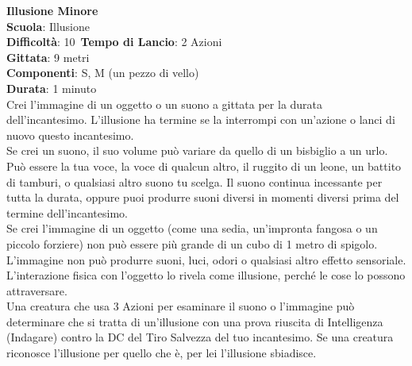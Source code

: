 \begin{multicols}{2}
\medskip\textbf{Illusione Minore}\\
\textbf{Scuola}: Illusione\\
\textbf{Difficoltà}: 10\
\textbf{Tempo di Lancio}: 2 Azioni\\
\textbf{Gittata}: 9 metri\\
\textbf{Componenti}: S, M (un pezzo di vello)\\
\textbf{Durata}: 1 minuto\\
Crei l'immagine di un oggetto o un suono a gittata per la durata dell'incantesimo. L'illusione ha termine se la interrompi con un'azione o lanci di nuovo questo incantesimo.\\
Se crei un suono, il suo volume può variare da quello di un bisbiglio a un urlo. Può essere la tua voce, la voce di qualcun altro, il ruggito di un leone, un battito di tamburi, o qualsiasi altro suono tu scelga. Il suono continua incessante per tutta la durata, oppure puoi produrre suoni diversi in momenti diversi prima del termine dell'incantesimo.\\
Se crei l'immagine di un oggetto (come una sedia, un'impronta fangosa o un piccolo forziere) non può essere più grande di un cubo di 1 metro di spigolo. L'immagine non può produrre suoni, luci, odori o qualsiasi altro effetto sensoriale. L'interazione fisica con l'oggetto lo rivela come illusione, perché le cose lo possono attraversare.\\
Una creatura che usa 3 Azioni per esaminare il suono o l'immagine può determinare che si tratta di un'illusione con una prova riuscita di Intelligenza (Indagare) contro la DC del Tiro Salvezza del tuo incantesimo. Se una creatura riconosce l'illusione per quello che è, per lei l'illusione sbiadisce. 


\end{multicols}
